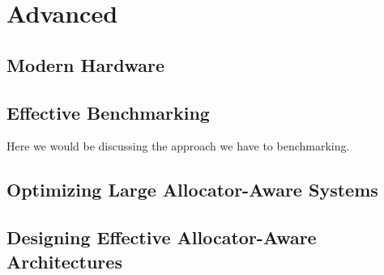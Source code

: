 \chapter{Advanced}
\section{Modern Hardware}
\section{Effective Benchmarking}

Here we would be discussing the approach we have to benchmarking.  

\section{Optimizing Large Allocator-Aware Systems}
\section{Designing Effective Allocator-Aware Architectures}

